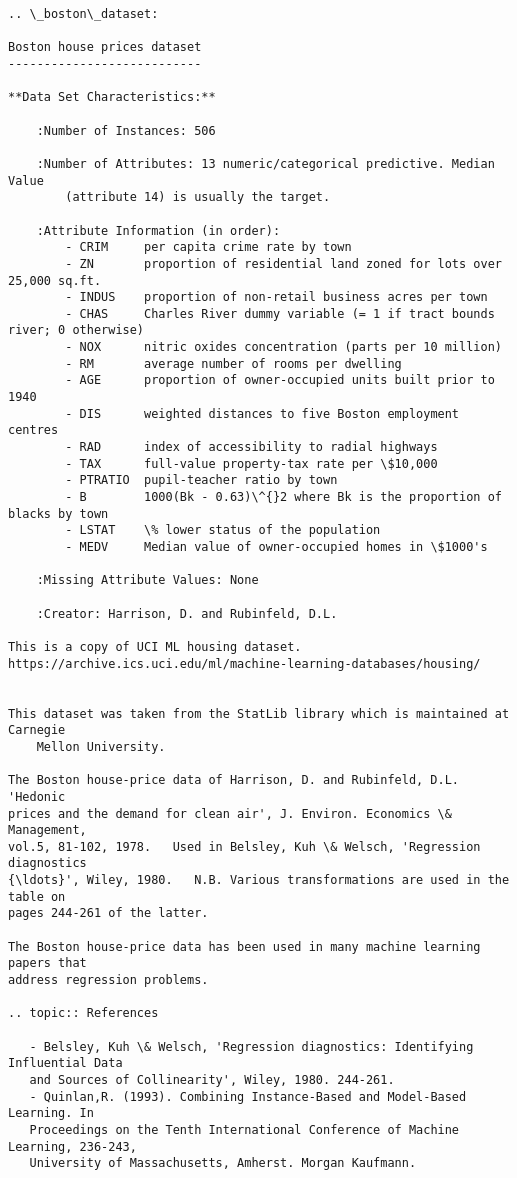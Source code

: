 \documentclass[11pt]{article}
\begin{document}
    \begin{Verbatim}[commandchars=\\\{\}]
.. \_boston\_dataset:

Boston house prices dataset
---------------------------

**Data Set Characteristics:**  

    :Number of Instances: 506 

    :Number of Attributes: 13 numeric/categorical predictive. Median Value
        (attribute 14) is usually the target.

    :Attribute Information (in order):
        - CRIM     per capita crime rate by town
        - ZN       proportion of residential land zoned for lots over 25,000 sq.ft.
        - INDUS    proportion of non-retail business acres per town
        - CHAS     Charles River dummy variable (= 1 if tract bounds river; 0 otherwise)
        - NOX      nitric oxides concentration (parts per 10 million)
        - RM       average number of rooms per dwelling
        - AGE      proportion of owner-occupied units built prior to 1940
        - DIS      weighted distances to five Boston employment centres
        - RAD      index of accessibility to radial highways
        - TAX      full-value property-tax rate per \$10,000
        - PTRATIO  pupil-teacher ratio by town
        - B        1000(Bk - 0.63)\^{}2 where Bk is the proportion of blacks by town
        - LSTAT    \% lower status of the population
        - MEDV     Median value of owner-occupied homes in \$1000's

    :Missing Attribute Values: None

    :Creator: Harrison, D. and Rubinfeld, D.L.

This is a copy of UCI ML housing dataset.
https://archive.ics.uci.edu/ml/machine-learning-databases/housing/


This dataset was taken from the StatLib library which is maintained at Carnegie
    Mellon University.

The Boston house-price data of Harrison, D. and Rubinfeld, D.L. 'Hedonic
prices and the demand for clean air', J. Environ. Economics \& Management,
vol.5, 81-102, 1978.   Used in Belsley, Kuh \& Welsch, 'Regression diagnostics
{\ldots}', Wiley, 1980.   N.B. Various transformations are used in the table on
pages 244-261 of the latter.

The Boston house-price data has been used in many machine learning papers that
address regression problems.   
     
.. topic:: References

   - Belsley, Kuh \& Welsch, 'Regression diagnostics: Identifying Influential Data 
   and Sources of Collinearity', Wiley, 1980. 244-261.
   - Quinlan,R. (1993). Combining Instance-Based and Model-Based Learning. In
   Proceedings on the Tenth International Conference of Machine Learning, 236-243, 
   University of Massachusetts, Amherst. Morgan Kaufmann.


    \end{Verbatim}
\end{document}
